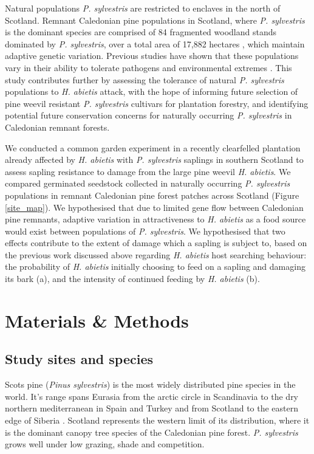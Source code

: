 \documentclass[a4paper, 11pt]{article}
\begin{document}
Natural populations \textit{P. sylvestris} are restricted to enclaves in the north of Scotland. Remnant Caledonian pine populations in Scotland, where \textit{P. sylvestris} is the dominant species \citep{Edwards2006} are comprised of 84 fragmented woodland stands dominated by \textit{P. sylvestris}, over a total area of 17,882 hectares \citep{Mason2004}, which maintain adaptive genetic variation. Previous studies have shown that these populations vary in their ability to tolerate pathogens \citep{Perry2016} and environmental extremes \citep{Salmela2013}. This study contributes further by assessing the tolerance of natural \textit{P. sylvestris} populations to \textit{H. abietis} attack, with the hope of informing future selection of pine weevil resistant \textit{P. sylvestris} cultivars for plantation forestry, and identifying potential future conservation concerns for naturally occurring \textit{P. sylvestris} in Caledonian remnant forests. 

We conducted a common garden experiment in a recently clearfelled plantation already affected by \textit{H. abietis} with \textit{P. sylvestris} saplings in southern Scotland to assess sapling resistance to damage from the large pine weevil \textit{H. abietis}. We compared germinated seedstock collected in naturally occurring \textit{P. sylvestris} populations in remnant Caledonian pine forest patches across Scotland (Figure \ref{site_map}). We hypothesised that due to limited gene flow between Caledonian pine remnants, adaptive variation in attractiveness to \textit{H. abietis} as a food source would exist between populations of \textit{P. sylvestris}. We hypothesised that two effects contribute to the extent of damage which a sapling is subject to, based on the previous work discussed above regarding \textit{H. abietis} host searching behaviour: the probability of \textit{H. abietis} initially choosing to feed on a sapling and damaging its bark (a), and the intensity of continued feeding by \textit{H. abietis} (b). 

\section*{Materials \& Methods}

\subsection*{Study sites and species}

Scots pine (\textit{Pinus sylvestris}) is the most widely distributed pine species in the world. It's range spans Eurasia from the arctic circle in Scandinavia to the dry northern mediterranean in Spain and Turkey and from Scotland to the eastern edge of Siberia \citep{GBIF2019, Carlisle1968}. Scotland represents the western limit of its distribution, where it is the dominant canopy tree species of the Caledonian pine forest. \textit{P. sylvestris} grows well under low grazing, shade and competition. 
\end{document}
